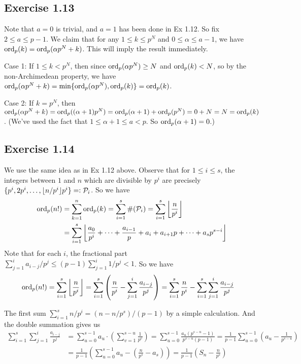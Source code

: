 \documentclass[../Koblitz.tex]{subfiles}
\begin{document}
\subsection*{Exercise 1.13}

Note that $a=0$ is trivial, and $a=1$ has been done in Ex 1.12. So fix $2\leq a\leq p-1$. We claim that for any $1\leq k\leq p^N$ and $0\leq\alpha\leq a-1$, we have $\operatorname{ord}_p(k)=\operatorname{ord}_p(\alpha p^N+k)$. This will imply the result immediately.

Case 1: If $1\leq k<p^N$, then since $\operatorname{ord}_p(\alpha p^N)\geq N$ and $\operatorname{ord}_p(k)<N$, so by the non-Archimedean property, we have $\operatorname{ord}_p(\alpha p^N+k) = \min\{\operatorname{ord}_p(\alpha p^N),\operatorname{ord}_p(k)\} = \operatorname{ord}_p(k)$.

Case 2: If $k=p^N$, then $\operatorname{ord}_p(\alpha p^N+k) = \operatorname{ord}_p((\alpha+1)p^N) = \operatorname{ord}_p(\alpha+1) + \operatorname{ord}_p(p^N) = 0+N = N = \operatorname{ord}_p(k)$. (We've used the fact that $1\leq \alpha+1 \leq a < p$. So $\operatorname{ord}_p(\alpha+1)=0$.)

\subsection*{Exercise 1.14}

We use the same idea as in Ex 1.12 above. Observe that for $1\leq i\leq s$, the integers between $1$ and $n$ which are divisible by $p^i$ are precisely $\{p^i,2p^i,\ldots,\lfloor n/p^i\rfloor p^i\}=:\mathcal{P}_i$. So we have
\begin{align*}
\operatorname{ord}_p(n!) &= \sum_{k=1}^n \operatorname{ord}_p(k) = \sum_{i=1}^s \#(\mathcal{P}_i) = \sum_{i=1}^s \left \lfloor \frac{n}{p^i} \right \rfloor \\
&= \sum_{i=1}^s \left \lfloor \frac{a_0}{p^i} + \cdots + \frac{a_{i-1}}{p} + a_i + a_{i+1}p + \cdots +a_sp^{s-i} \right \rfloor
\end{align*}
Note that for each $i$, the fractional part $\sum_{j=1}^i a_{i-j}/p^j \leq (p-1)\sum_{j=1}^i 1/p^j < 1$. So we have
\begin{align*}
\operatorname{ord}_p(n!) &= \sum_{i=1}^s \left \lfloor \frac{n}{p^i} \right \rfloor = \sum_{i=1}^s \left(\frac{n}{p^i}- \sum_{j=1}^i \frac{a_{i-j}}{p^j} \right) = \sum_{i=1}^s \frac{n}{p^i} - \sum_{i=1}^s \sum_{j=1}^i \frac{a_{i-j}}{p^j}
\end{align*}

The first sum $\sum_{i=1}^s n/p^i = (n-n/p^s)/(p-1)$ by a simple calculation. And the double summation gives us
\begin{align*}
\sum_{i=1}^s \sum_{j=1}^i \frac{a_{i-j}}{p^j} &= \sum_{u=0}^{s-1} a_u\cdot\left( \sum_{v=1}^{s-u} \frac{1}{p^v} \right)= \sum_{u=0}^{s-1} \frac{a_u(p^{s-u}-1)}{p^{s-u}(p-1)} = \frac{1}{p-1} \sum_{u=0}^{s-1}\left(a_u-\frac{1}{p^{s-u}}\right) \\
&= \frac{1}{p-1} \left(\sum_{u=0}^{s-1} a_u - \left(\frac{n}{p^s}-a_s\right)\right) = \frac{1}{p-1} \left(S_n - \frac{n}{p^s}\right) 
\end{align*}
\end{document}
